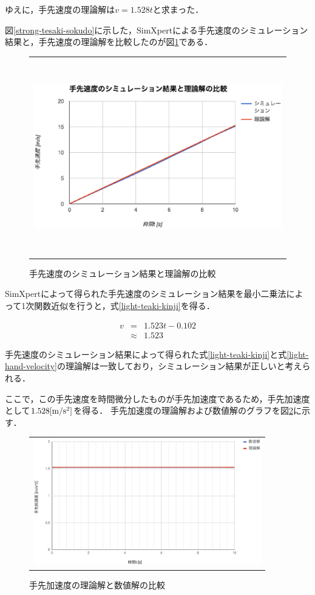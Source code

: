 ゆえに，手先速度の理論解は\(v=1.528t\)と求まった．

図\ref{strong-tesaki-sokudo}に示した，SimXpertによる手先速度のシミュレーション結果と，手先速度の理論解を比較したのが図\ref{light-compare-vel}である．

\begin{figure}[htbp]
  \begin{center}
    \begin{tabular}{c}
      \includegraphics[height=8.5cm]{img/eps/light-compare-vel.eps}
    \end{tabular}
    \caption{手先速度のシミュレーション結果と理論解の比較}
    \label{light-compare-vel}
  \end{center}
\end{figure}

SimXpertによって得られた手先速度のシミュレーション結果を最小二乗法によって1次関数近似を行うと，式\ref{light-teaki-kinji}を得る．

\begin{eqnarray}
 v &=& 1.523t - 0.102 \nonumber \\
 &\approx& 1.523
  \label{light-teaki-kinji}
\end{eqnarray}

手先速度のシミュレーション結果によって得られた式\ref{light-teaki-kinji}と式\ref{light-hand-velocity}の理論解は一致しており，シミュレーション結果が正しいと考えられる．

ここで，この手先速度を時間微分したものが手先加速度であるため，手先加速度として\(1.528[\rm m/s^2]\)を得る．
手先加速度の理論解および数値解のグラフを図\ref{light-acc}に示す．

\begin{figure}[htbp]
  \begin{center}
    \begin{tabular}{c}
      \includegraphics[height=5.5cm]{img/eps/light-acc.eps}
    \end{tabular}
    \caption{手先加速度の理論解と数値解の比較}
    \label{light-acc}
  \end{center}
\end{figure}
